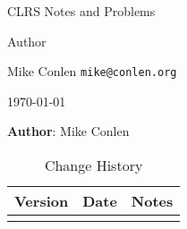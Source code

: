 \documentclass[oneside]{book}
\theoremstyle{definition}
\theoremstyle{plain}
\begin{document}
\fancyhf{} 
\renewcommand{\headrulewidth}{0pt}
\fancyfoot[C]{\thepage}

\frontmatter
\begin{titlepage}
	\vspace{1 in}
	\centering
	{\LARGE {CLRS Notes and Problems}\par}
	\vspace{1 cm}
	Author\par 
	Mike Conlen \texttt{mike@conlen.org}\par
	\vspace{1 cm}
	\today
\end{titlepage}

\thispagestyle{empty}
\textbf{Author}: Mike Conlen \\

\begin{table}[ht]
	\begin{tabular}{l l l}
		\toprule
		Version & Date & Notes \\
		\hline
		&& \\
		\bottomrule
	\end{tabular}
	\caption{Change History}\label{tab:history}
\end{table}

\tableofcontents
\lstlistoflistings
\end{document}
